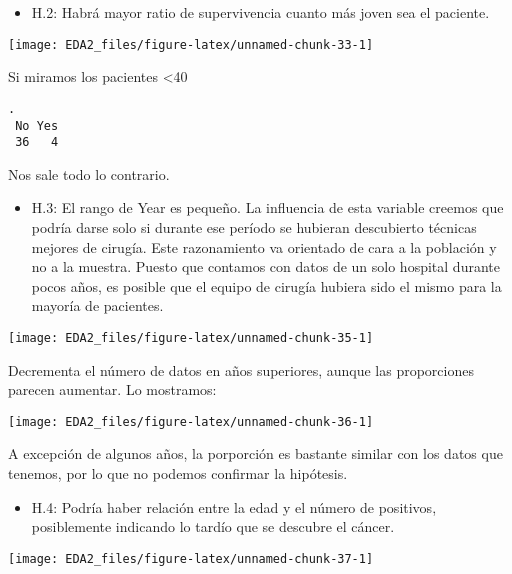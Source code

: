 \documentclass[
]{article}
\providecommand{\tightlist}{%
  \setlength{\itemsep}{0pt}\setlength{\parskip}{0pt}}
\begin{document}
\begin{itemize}
\tightlist
\item
  H.2: Habrá mayor ratio de supervivencia cuanto más joven sea el
  paciente.
\end{itemize}

\begin{center}\texttt{[image: EDA2\_files/figure-latex/unnamed-chunk-33-1]} \end{center}

Si miramos los pacientes \textless40

\begin{verbatim}
.
 No Yes 
 36   4 
\end{verbatim}

Nos sale todo lo contrario.

\begin{itemize}
\tightlist
\item
  H.3: El rango de Year es pequeño. La influencia de esta variable
  creemos que podría darse solo si durante ese período se hubieran
  descubierto técnicas mejores de cirugía. Este razonamiento va
  orientado de cara a la población y no a la muestra. Puesto que
  contamos con datos de un solo hospital durante pocos años, es posible
  que el equipo de cirugía hubiera sido el mismo para la mayoría de
  pacientes.
\end{itemize}

\begin{center}\texttt{[image: EDA2\_files/figure-latex/unnamed-chunk-35-1]} \end{center}

Decrementa el número de datos en años superiores, aunque las
proporciones parecen aumentar. Lo mostramos:

\begin{center}\texttt{[image: EDA2\_files/figure-latex/unnamed-chunk-36-1]} \end{center}

A excepción de algunos años, la porporción es bastante similar con los
datos que tenemos, por lo que no podemos confirmar la hipótesis.

\begin{itemize}
\tightlist
\item
  H.4: Podría haber relación entre la edad y el número de positivos,
  posiblemente indicando lo tardío que se descubre el cáncer.
\end{itemize}

\begin{center}\texttt{[image: EDA2\_files/figure-latex/unnamed-chunk-37-1]} \end{center}
\end{document}
